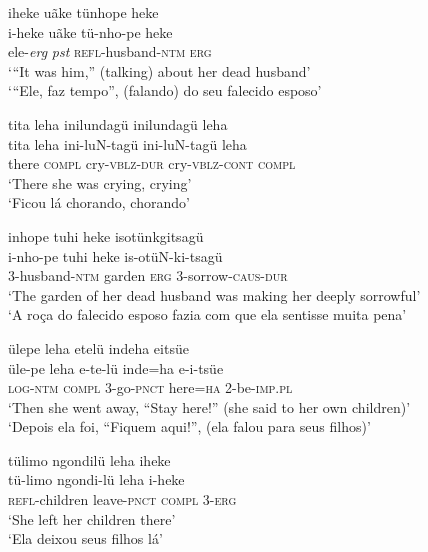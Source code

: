 \documentclass[output=paper,
modfonts,nonflat
]{langsci/langscibook}
\begin{document}
\ea iheke uãke tünhope heke{\footnotemark} \\[.3em]
\gll i-heke	uãke	tü-nho-pe		heke \\
ele-\emph{erg}	\emph{pst} 	\textsc{refl}-husband-\textsc{ntm} 	\textsc{erg} \\
\glt ‘“It was him,” (talking) about her dead husband’ \\
‘“Ele, faz tempo”, (falando) do seu falecido esposo’ \\
\z

\ea tita leha inilundagü inilundagü leha\\[.3em]
\gll tita	leha	ini-luN-tagü		ini-luN-tagü		leha\\
there 	\textsc{compl}  cry-\textsc{vblz-dur}		cry-\textsc{vblz}-\textsc{cont} 	\textsc{compl} \\
\glt ‘There she was crying, crying’\\
‘Ficou lá chorando, chorando’\\
\z

\ea inhope tuhi heke isotünkgitsagü\\[.3em]
\gll i-nho-pe	tuhi	heke	is-otüN-ki-tsagü\\
3-husband-\textsc{ntm}	garden 	\textsc{erg} 	3-sorrow-\textsc{caus}-\textsc{dur} \\
\glt ‘The garden of her dead husband was making her deeply sorrowful’ \\
‘A roça do falecido esposo fazia com que ela sentisse muita pena’\\
\z

 \ea ülepe leha etelü indeha eitsüe\\[.3em]
\gll üle-pe		leha		e-te-lü		inde=ha	e-i-tsüe\\
\textsc{log}-\textsc{ntm} \textsc{compl}		3-go-\textsc{pnct} 	here=\textsc{ha} 	2-be-\textsc{imp.pl} \\
\glt ‘Then she went away, “Stay here!” (she said to her own children)’\\
‘Depois ela foi, “Fiquem aqui!”,	(ela falou para seus filhos)’\\
\z

\ea tülimo ngondilü leha iheke \\[.3em]
\gll tü-limo	ngondi-lü	leha	i-heke\\
\textsc{refl}-children 	leave-\textsc{pnct} 	\textsc{compl}	3-\textsc{erg} \\
\glt ‘She left her children there’\\
‘Ela deixou seus filhos lá’\\
\z
\end{document}
